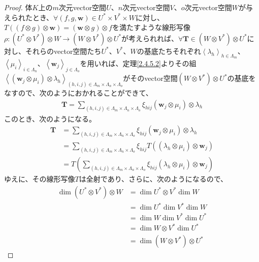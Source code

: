 \documentclass[dvipdfmx]{jsarticle}
\begin{document}
\begin{proof}
体$K$上の$m$次元vector空間$U$、$n$次元vector空間$V$、$o$次元vector空間$W$が与えられたとき、$\forall\left( f,g,\mathbf{w} \right) \in U^{*} \times V^{*} \times W$に対し、$T\left( (f \otimes g) \otimes \mathbf{w} \right) = \left( \mathbf{w} \otimes g \right) \otimes f$を満たすような線形写像$\rho:\left( U^{*} \otimes V^{*} \right) \otimes W \rightarrow \left( W \otimes V^{*} \right) \otimes U^{*}$が考えられれば、$\forall\mathbf{T} \in \left( W \otimes V^{*} \right) \otimes U^{*}$に対し、それらのvector空間たち$U^{*}$、$V^{*}$、$W$の基底たちそれぞれ$\left\langle \lambda_{h} \right\rangle_{h \in \varLambda_{m}}$、$\left\langle \mu_{i} \right\rangle_{i \in \varLambda_{n}}$、$\left\langle \mathbf{w}_{j} \right\rangle_{j \in \varLambda_{o}}$を用いれば、定理\ref{2.4.5.2}よりその組$\left\langle \left( \mathbf{w}_{j} \otimes \mu_{i} \right) \otimes \lambda_{h} \right\rangle_{(h,i,j) \in \varLambda_{m} \times \varLambda_{n} \times \varLambda_{o}}$がそのvector空間$\left( W \otimes V^{*} \right) \otimes U^{*}$の基底をなすので、次のようにおかれることができて、
\begin{align*}
\mathbf{T} = \sum_{(h,i,j) \in \varLambda_{m} \times \varLambda_{n} \times \varLambda_{o}} {\xi_{hij}\left( \mathbf{w}_{j} \otimes \mu_{i} \right) \otimes \lambda_{h}}
\end{align*}
このとき、次のようになる。
\begin{align*}
\mathbf{T} &= \sum_{(h,i,j) \in \varLambda_{m} \times \varLambda_{n} \times \varLambda_{o}} {\xi_{hij}\left( \mathbf{w}_{j} \otimes \mu_{i} \right) \otimes \lambda_{h}}\\
&= \sum_{(h,i,j) \in \varLambda_{m} \times \varLambda_{n} \times \varLambda_{o}} {\xi_{hij}T\left( \left( \lambda_{h} \otimes \mu_{i} \right) \otimes \mathbf{w}_{j} \right)}\\
&= T\left( \sum_{(h,i,j) \in \varLambda_{m} \times \varLambda_{n} \times \varLambda_{o}} {\xi_{hij}\left( \lambda_{h} \otimes \mu_{i} \right) \otimes \mathbf{w}_{j}} \right)
\end{align*}
ゆえに、その線形写像$T$は全射であり、さらに、次のようになるので、
\begin{align*}
\dim{\left( U^{*} \otimes V^{*} \right) \otimes W} &= \dim{U^{*} \otimes V^{*}}\dim W\\
&= \dim U^{*}\dim V^{*}\dim W\\
&= \dim W\dim V^{*}\dim U^{*}\\
&= \dim{W \otimes V^{*}}\dim U^{*}\\
&= \dim{\left( W \otimes V^{*} \right) \otimes U^{*}}

\end{align*}
\end{proof}
\end{document}
